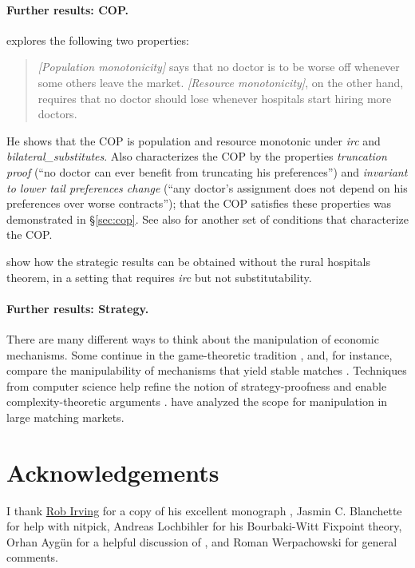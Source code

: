 \documentclass[11pt,a4paper]{article}
\begin{document}
\paragraph{Further results: COP.} \citet{Afacan:2014} explores the
following two properties:
\begin{quote}

  \emph{[Population monotonicity]} says that no doctor is to be worse
  off whenever some others leave the market. \emph{[Resource
    monotonicity]}, on the other hand, requires that no doctor should
  lose whenever hospitals start hiring more doctors.

\end{quote}
He shows that the COP is population and resource monotonic under
\emph{irc} and \emph{bilateral\_substitutes}. Also \citet{Afacan:2015}
characterizes the COP by the properties \emph{truncation proof} (``no
doctor can ever benefit from truncating his preferences'') and
\emph{invariant to lower tail preferences change} (``any doctor's
assignment does not depend on his preferences over worse contracts'');
that the COP satisfies these properties was demonstrated in
\S\ref{sec:cop}. See also \citet{HatfieldKominersWestkamp:2016} for
another set of conditions that characterize the COP.

\citet{HirataKasuya:2016} show how the strategic results can be
obtained without the rural hospitals theorem, in a setting that
requires \emph{irc} but not substitutability.

\paragraph{Further results: Strategy.} There are many different ways
to think about the manipulation of economic mechanisms. Some continue
in the game-theoretic tradition \citep{Gonczarowski:2014}, and, for
instance, compare the manipulability of mechanisms that yield stable
matches \citep{ChenEgesdalPyciaUenmez:2016}. Techniques from computer
science help refine the notion of strategy-proofness
\citep{AshlagiGonczarowski:2015} and enable complexity-theoretic
arguments
\citep{DBLP:conf/atal/AzizSW15,DengShenTang:2016}. \citet{KojimaPathak:2009}
have analyzed the scope for manipulation in large matching markets.


\section{Acknowledgements}

I thank \href{http://www.dcs.gla.ac.uk/~rwi/}{Rob Irving} for a copy
of his excellent monograph \citep{GusfieldIrving:1989}, Jasmin
C. Blanchette for help with nitpick, Andreas Lochbihler for his
Bourbaki-Witt Fixpoint theory, Orhan Aygün for a helpful discussion of
\citet{AygunSonmez:2012-WP}, and Roman Werpachowski for general
comments.



\end{document}
